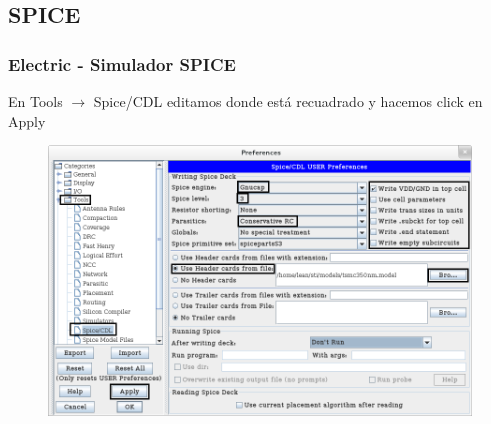 \documentclass{beamer}
\begin{document}
\begin{frame}[fragile]
\subsection{SPICE}
\frametitle{Electric - Simulador SPICE}

\noindent En Tools $\rightarrow$ Spice/CDL editamos donde está recuadrado y hacemos click en Apply 

\begin{figure}
\includegraphics[width=0.6\linewidth]{figuras/configuracionElectric-3.png}
\end{figure}
\end{frame}
\end{document}
